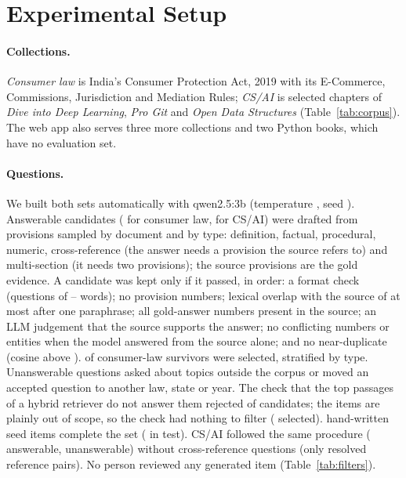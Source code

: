 \section{Experimental Setup}
\label{sec:setup}



\paragraph{Collections.}
\emph{Consumer law} is India's Consumer Protection Act, 2019 with its E-Commerce, Commissions, Jurisdiction and Mediation Rules; \emph{CS/AI} is selected chapters of \emph{Dive into Deep Learning}, \emph{Pro Git} and \emph{Open Data Structures} (Table~\ref{tab:corpus}).
The web app also serves three more collections and two Python books, which have no evaluation set.

\paragraph{Questions.}
We built both sets automatically with qwen2.5:3b (temperature , seed ).
Answerable candidates ( for consumer law,  for CS/AI) were drafted from provisions sampled by document and by type: definition, factual, procedural, numeric, cross-reference (the answer needs a provision the source refers to) and multi-section (it needs two provisions); the source provisions are the gold evidence.
A candidate was kept only if it passed, in order: a format check (questions of -- words); no provision numbers; lexical overlap with the source of at most  after one paraphrase; all gold-answer numbers present in the source; an LLM judgement that the source supports the answer; no conflicting numbers or entities when the model answered from the source alone; and no near-duplicate (cosine above ).
 of  consumer-law survivors were selected, stratified by type.
Unanswerable questions asked about topics outside the corpus or moved an accepted question to another law, state or year.
The check that the top  passages of a hybrid retriever do not answer them rejected  of  candidates; the items are plainly out of scope, so the check had nothing to filter ( selected).
 hand-written seed items complete the set ( in test).
CS/AI followed the same procedure ( answerable,  unanswerable) without cross-reference questions (only  resolved reference pairs). No person reviewed any generated item (Table~\ref{tab:filters}).

